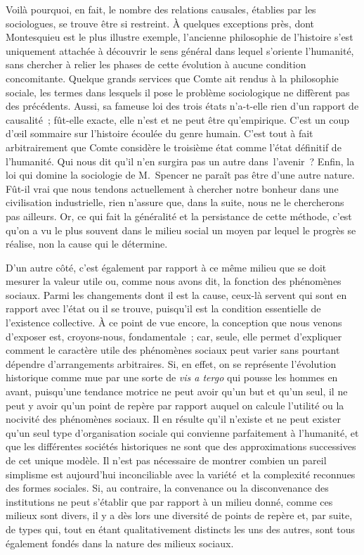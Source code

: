 \documentclass[french,twoside]{book} %
\begin{document}
Voilà pourquoi, en fait, le nombre des relations causales, établies par les sociologues, se trouve être si restreint. À quelques exceptions près, dont Montesquieu est le plus illustre exemple, l’ancienne philosophie de l’histoire s’est uniquement attachée à découvrir le sens général dans lequel s’oriente l’humanité, sans chercher à relier les phases de cette évolution à aucune condition concomitante. Quelque grands services que Comte ait rendus à la philosophie sociale, les termes dans lesquels il pose le problème sociologique ne diffèrent pas des précédents. Aussi, sa fameuse loi des trois états n’a-t-elle rien d’un rapport de causalité ; fût-elle exacte, elle n’est et ne peut être qu’empirique. C’est un coup d’œil sommaire sur l’histoire écoulée du genre humain. C’est tout à fait arbitrairement que Comte considère le troisième état comme l’état définitif de l’humanité. Qui nous dit qu’il n’en surgira pas un autre dans l’avenir ? Enfin, la loi qui domine la sociologie de M. Spencer ne paraît pas être d’une autre nature. Fût-il vrai que nous tendons actuellement à chercher notre bonheur dans une civilisation industrielle, rien n’assure que, dans la suite, nous ne le chercherons pas ailleurs. Or, ce qui fait la généralité et la persistance de cette méthode, c’est qu’on a vu le plus souvent dans le milieu social un moyen par lequel le progrès se réalise, non la cause qui le détermine.\par
D’un autre côté, c’est également par rapport à ce même milieu que se doit mesurer la valeur utile ou, comme nous avons dit, la fonction des phénomènes sociaux. Parmi les changements dont il est la cause, ceux-là servent qui sont en rapport avec l’état ou il se trouve, puisqu’il est la condition essentielle de l’existence collective. À ce point de vue encore, la conception que nous venons d’exposer est, croyons-nous, fondamentale ; car, seule, elle permet d’expliquer comment le caractère utile des phénomènes sociaux peut varier sans pourtant dépendre d’arrangements arbitraires. Si, en effet, on se représente l’évolution historique comme mue par une sorte de {\itshape vis a tergo} qui pousse les hommes en avant, puisqu’une tendance motrice ne peut avoir qu’un but et qu’un seul, il ne peut y avoir qu’un point de repère par rapport auquel on calcule l’utilité ou la nocivité des phénomènes sociaux. Il en résulte qu’il n’existe et ne peut exister qu’un seul type d’organisation sociale qui convienne parfaitement à l’humanité, et que les différentes sociétés historiques ne sont que des approximations successives de cet unique modèle. Il n’est pas nécessaire de montrer combien un pareil simplisme est aujourd’hui inconciliable avec la variété et la complexité reconnues des formes sociales. Si, au contraire, la convenance ou la disconvenance des institutions ne peut s’établir que par rapport à un milieu donné, comme ces milieux sont divers, il y a dès lors une diversité de points de repère et, par suite, de types qui, tout en étant qualitativement distincts les uns des autres, sont tous également fondés dans la nature des milieux sociaux.\par
\end{document}
